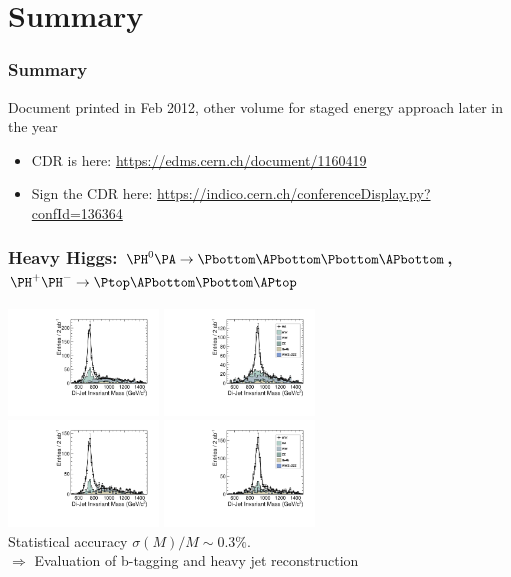 \documentclass{beamer}
\begin{document}
\section{Summary}
\begin{frame}
\frametitle{Summary}
Document printed in Feb 2012, other volume for staged energy approach later in the year
\begin{itemize}
  \item CDR is here:  \url{https://edms.cern.ch/document/1160419}
  \item Sign the CDR here:
  \url{https://indico.cern.ch/conferenceDisplay.py?confId=136364}
\end{itemize}
\end{frame}

\appendix


\begin{frame}
\frametitle{Heavy Higgs: $\PH^0\PA\to\Pbottom\APbottom\Pbottom\APbottom$,
$\PH^+\PH^-\to\Ptop\APbottom\Pbottom\APtop$}
\centering
\includegraphics[width=4cm]{HAMass742_Bkg_CKFM_00BX_FJ.pdf}
\includegraphics[width=4cm]{HAMass902_Bkg_CKFM_00BX_FJ.pdf}\\
\includegraphics[width=4cm]{Hpm_Mass742_Bkg_CKFM_00BX_FJ.pdf}
\includegraphics[width=4cm]{Hpm_Mass902_Bkg_CKFM_00BX_FJ.pdf}\\
{\scriptsize Statistical accuracy $\sigma(M)/M \sim0.3\%$.}\\
$\Rightarrow$ Evaluation of b-tagging and heavy jet reconstruction
\end{frame}
\end{document}
